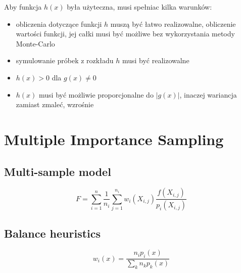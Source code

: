 \documentclass[../main.tex]{subfiles}
\begin{document}
Aby funkcja $h(x)$ była użyteczna, musi spełniac kilka warunków:

\begin{itemize}

  \item obliczenia dotyczące funkcji $h$ muszą być łatwo realizowalne,
    obliczenie wartości funkcji, jej całki musi być możliwe bez wykorzystania
    metody Monte-Carlo

  \item symulowanie próbek z rozkładu $h$ musi być realizowalne

  \item $h(x) > 0$ dla $g(x) \neq 0$

  \item $h(x)$ musi być możliwie proporcjonalne do $|g(x)|$, inaczej wariancja
    zamiast zmaleć, wzrośnie

\end{itemize}

\section{Multiple Importance Sampling}

\cite{pbrt}

\subsection{Multi-sample model}

\[
  F = \sum_{i=1}^{n} \frac{1}{n_i} \sum_{j=1}^{n_i} w_{i}(X_{i,j}) \frac{
    f(X_{i,j})
  }{
    p_{i}(X_{i,j})
  }
\]

\subsection{Balance heuristics}

\[
  w_{i}(x) = \frac{
    n_{i} p_{i}(x)
  }{
    \sum_{k} {
      n_{k} p_{k}(x)
    }
  }
\]
\end{document}

